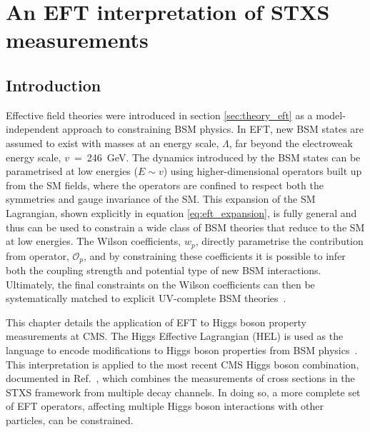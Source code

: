 \chapter{An EFT interpretation of STXS measurements}
\label{chap:eft}

\section{Introduction}

Effective field theories were introduced in section \ref{sec:theory_eft} as a model-independent approach to constraining BSM physics. In EFT, new BSM states are assumed to exist with masses at an energy scale, $\Lambda$, far beyond the electroweak energy scale, $v$~=~246~GeV. The dynamics introduced by the BSM states can be parametrised at low energies ($E \sim v$) using higher-dimensional operators built up from the SM fields, where the operators are confined to respect both the symmetries and gauge invariance of the SM. This expansion of the SM Lagrangian, shown explicitly in equation \ref{eq:eft_expansion}, is fully general and thus can be used to constrain a wide class of BSM theories that reduce to the SM at low energies. The Wilson coefficients, $w_p$, directly parametrise the contribution from operator, $\mathcal{O}_p$, and by constraining these coefficients it is possible to infer both the coupling strength and potential type of new BSM interactions. Ultimately, the final constraints on the Wilson coefficients can then be systematically matched to explicit UV-complete BSM theories~\cite{Marzocca:2020jze}.

This chapter details the application of EFT to Higgs boson property measurements at CMS. The Higgs Effective Lagrangian (HEL) is used as the language to encode modifications to Higgs boson properties from BSM physics~\cite{Contino:2013kra,Alloul:2013naa}. This interpretation is applied to the most recent CMS Higgs boson combination, documented in Ref.~\cite{CMS-PAS-HIG-19-005}, which combines the measurements of cross sections in the STXS framework from multiple decay channels. In doing so, a more complete set of EFT operators, affecting multiple Higgs boson interactions with other particles, can be constrained. 

